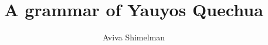 

\title{A grammar of Yauyos Quechua}  %
\dedication{For my father}
\typesetter{}
\proofreader{}
\author{Aviva Shimelman}    

\renewcommand{\lsISBNdigital}{978-3-946234-21-0}
\renewcommand{\lsISBNhardcover}{978-3-946234-22-7}
\renewcommand{\lsISBNsoftcover}{978-3-946234-23-4}
                 
\renewcommand{\lsSeries}{sidl} %
\renewcommand{\lsSeriesNumber}{9} %
\renewcommand{\lsURL}{http://langsci-press.org/catalog/book/83} %
